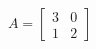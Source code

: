 \documentclass[preview]{standalone}
\begin{document}
\begin{align*}
A=\begin{bmatrix}3&0\\1&2\end{bmatrix}
\end{align*}
\end{document}
